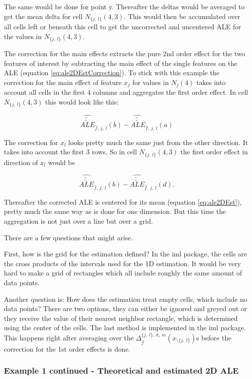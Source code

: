 \documentclass[]{krantz}
\begin{document}
The same would be done for point y. Thereafter the deltas would be
averaged to get the mean delta for cell \(N_{\{j,~l\}}(4,3)\). This
would then be accumulated over all cells left or beneath this cell to
get the uncorrected and uncentered ALE for the values in
\(N_{\{j,~l\}}(4,3)\).

The correction for the main effects extracts the pure 2nd order effect
for the two features of interest by subtracting the main effect of the
single features on the ALE (equation \eqref{eq:ale2DEstCorrection}). To
stick with this example the correction for the main effect of feature
\(x_j\) for values in \(N_j(4)\) takes into account all cells in the
first 4 columns and aggregates the first order effect. In cell
\(N_{\{j,~l\}}(4,3)\) this would look like this:

\[ \widehat{\widetilde{\widetilde{ALE}}}_{\hat{f},~j,~l}(b) - \widehat{\widetilde{\widetilde{ALE}}}_{\hat{f},~j,~l}(a)\]

The correction for \(x_l\) looks pretty much the same just from the
other direction. It takes into account the first 3 rows. So in cell
\(N_{\{j,~l\}}(4,3)\) the first order effect in direction of \(x_l\)
would be

\[ \widehat{\widetilde{\widetilde{ALE}}}_{\hat{f},~j,~l}(b) - \widehat{\widetilde{\widetilde{ALE}}}_{\hat{f},~j,~l}(d). \]

Thereafter the corrected ALE is centered for its mean (equation
\eqref{eq:ale2DEst}), pretty much the same way as is done for one
dimension. But this time the aggregation is not just over a line but
over a grid.

There are a few questions that might arise.

First, how is the grid for the estimation defined? In the iml package,
the cells are the cross products of the intervals used for the 1D
estimation. It would be very hard to make a grid of rectangles which all
include roughly the same amount of data points.

Another question is: How does the estimation treat empty cells, which
include no data points? There are two options, they can either be
ignored and greyed out or they receive the value of their nearest
neighbor rectangle, which is determined using the center of the cells.
The last method is implemented in the iml package. This happens right
after averaging over the
\(\Delta_{\hat f}^{{\{j,~l\}}, ~k,~m} (x_{\setminus\{j,~l\}})\)s before
the correction for the 1st order effects is done.

\subsubsection{Example 1 continued - Theoretical and estimated 2D
ALE}\label{example-1-continued---theoretical-and-estimated-2d-ale}
\end{document}
